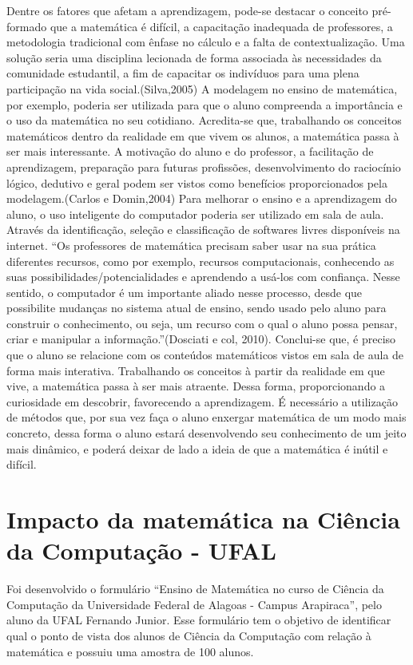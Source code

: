 \documentclass[12pt,a4paper]{article}
\begin{document}
Dentre os fatores que afetam a aprendizagem, pode-se destacar o conceito pré-formado que a matemática é difícil, a capacitação inadequada de professores, a metodologia tradicional com ênfase no cálculo e a falta de contextualização. Uma solução seria uma disciplina lecionada de forma associada às necessidades da comunidade estudantil, a fim de capacitar os indivíduos para uma plena participação na vida social.(Silva,2005) 
A modelagem no ensino de matemática, por exemplo, poderia ser utilizada para que o aluno compreenda a importância e o uso da matemática no seu cotidiano. Acredita-se que, trabalhando os conceitos matemáticos dentro da realidade em que vivem os alunos, a matemática passa à ser mais interessante. A motivação do aluno e do professor, a facilitação de aprendizagem, preparação para futuras profissões, desenvolvimento do raciocínio lógico, dedutivo e geral podem ser vistos como benefícios proporcionados pela modelagem.(Carlos e Domin,2004)
Para melhorar o ensino e a aprendizagem do aluno, o uso inteligente do computador poderia ser utilizado em sala de aula. Através da identificação, seleção e classificação de softwares livres disponíveis na internet.
“Os professores de matemática precisam saber usar na sua prática  diferentes  recursos, como por exemplo, recursos computacionais, conhecendo as suas  possibilidades/potencialidades e aprendendo a usá-los com confiança. Nesse sentido, o computador é um importante aliado nesse processo, desde que possibilite mudanças no sistema atual de ensino, sendo usado pelo aluno para construir o conhecimento, ou seja, um recurso com o qual o aluno possa pensar, criar e manipular a informação.”(Dosciati e col, 2010).
Conclui-se que, é preciso que o aluno se relacione com os conteúdos matemáticos vistos em sala de aula de forma mais interativa. Trabalhando os conceitos à partir da realidade em que vive, a matemática passa à ser mais atraente. Dessa forma, proporcionando a curiosidade em descobrir, favorecendo a aprendizagem. É necessário a utilização de métodos que, por sua vez faça o aluno enxergar matemática de um modo mais concreto, dessa forma o aluno estará desenvolvendo seu conhecimento   de um jeito mais dinâmico, e poderá deixar de lado a ideia de que a matemática é inútil e difícil.

\section{Impacto da matemática na Ciência da Computação - UFAL}

Foi desenvolvido o formulário “Ensino de Matemática no curso de Ciência da Computação da Universidade Federal de Alagoas - Campus Arapiraca”, pelo aluno da UFAL Fernando Junior. Esse formulário tem o objetivo de identificar qual o ponto de vista dos alunos de Ciência da Computação com relação à matemática e possuiu uma amostra de 100 alunos. 
\end{document}
